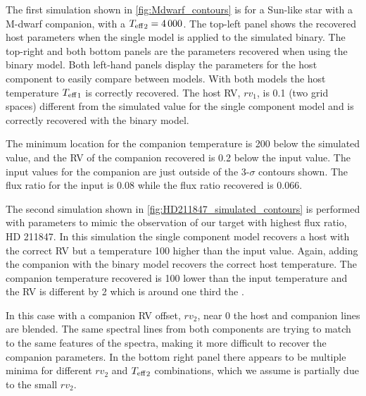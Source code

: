 The first simulation shown in \cref{fig:Mdwarf_contours} is for a Sun-like star with a M-dwarf companion, with a \({T_{\mathrm{eff}}}_{2} =4\,000\)\K{}.
The top-left panel shows the recovered host parameters when the single model is applied to the simulated binary.
The top-right and both bottom panels are the parameters recovered when using the binary model.
Both left-hand panels display the parameters for the host component to easily compare between models.
With both models the host temperature \({T_{\mathrm{eff}}}_{1}\) is correctly recovered.
The host {RV}, \({rv}_1\), is 0.1\kmps{} (two grid spaces) different from the simulated value for the single component model and is correctly recovered with the binary model.

The minimum \textchisquared{} location for the companion temperature is 200\K{} below the simulated value, and the {RV} of the companion recovered is 0.2\kmps{} below the input value.
The input values for the companion are just outside of the 3-\(\sigma\) contours shown.
The flux ratio for the input is 0.08 while the flux ratio recovered is 0.066.

The second simulation shown in \cref{fig:HD211847_simulated_contours} is performed with parameters to mimic the observation of our target with highest flux ratio, {HD 211847}.
In this simulation the single component model recovers a host with the correct {RV} but a temperature 100\K{} higher than the input value.
Again, adding the companion with the binary model recovers the correct host temperature.
The companion temperature recovered is 100\K{} lower than the input temperature and the {RV} is different by 2\kmps{} which is around one third the {\fwhm}.

In this case with a companion {RV} offset, \({rv}_2\), near 0\kmps{} the host and companion lines are blended.
The same spectral lines from both components are trying to match to the same features of the spectra, making it more difficult to recover the companion parameters.
In the bottom right panel there appears to be multiple minima for different \({rv}_2\) and \({T_{\mathrm{eff}}}_{2}\) combinations, which we assume is partially due to the small \({rv}_2\).

